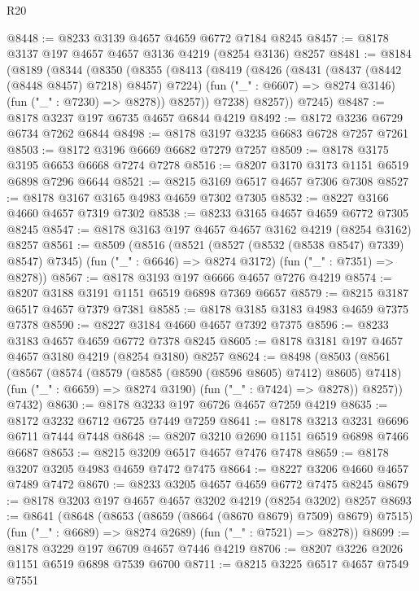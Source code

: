 \begin{lexlean}{R20}
\begin{coremodule}
@8448 := @8233 @3139 @4657 @4659 @6772 @7184 @8245
@8457 := @8178 @3137 @197 @4657 @4657 @3136 @4219 (@8254 @3136) @8257
@8481 := @8184
    (@8189
      (@8344
        (@8350
          (@8355
            (@8413
              (@8419
                (@8426
                  (@8431 (@8437 (@8442 (@8448 @8457) @7218) @8457) @7224)
                  (fun ("_" : @6607) => @8274 @3146)
                  (fun ("_" : @7230) => @8278))
                @8257))
            @7238)
          @8257))
      @7245)
@8487 := @8178 @3237 @197 @6735 @4657 @6844 @4219
@8492 := @8172 @3236 @6729 @6734 @7262 @6844
@8498 := @8178 @3197 @3235 @6683 @6728 @7257 @7261
@8503 := @8172 @3196 @6669 @6682 @7279 @7257
@8509 := @8178 @3175 @3195 @6653 @6668 @7274 @7278
@8516 := @8207 @3170 @3173 @1151 @6519 @6898 @7296 @6644
@8521 := @8215 @3169 @6517 @4657 @7306 @7308
@8527 := @8178 @3167 @3165 @4983 @4659 @7302 @7305
@8532 := @8227 @3166 @4660 @4657 @7319 @7302
@8538 := @8233 @3165 @4657 @4659 @6772 @7305 @8245
@8547 := @8178 @3163 @197 @4657 @4657 @3162 @4219 (@8254 @3162) @8257
@8561 := @8509
    (@8516
      (@8521 (@8527 (@8532 (@8538 @8547) @7339) @8547) @7345)
      (fun ("_" : @6646) => @8274 @3172)
      (fun ("_" : @7351) => @8278))
@8567 := @8178 @3193 @197 @6666 @4657 @7276 @4219
@8574 := @8207 @3188 @3191 @1151 @6519 @6898 @7369 @6657
@8579 := @8215 @3187 @6517 @4657 @7379 @7381
@8585 := @8178 @3185 @3183 @4983 @4659 @7375 @7378
@8590 := @8227 @3184 @4660 @4657 @7392 @7375
@8596 := @8233 @3183 @4657 @4659 @6772 @7378 @8245
@8605 := @8178 @3181 @197 @4657 @4657 @3180 @4219 (@8254 @3180) @8257
@8624 := @8498
    (@8503
      (@8561
        (@8567
          (@8574
            (@8579 (@8585 (@8590 (@8596 @8605) @7412) @8605) @7418)
            (fun ("_" : @6659) => @8274 @3190)
            (fun ("_" : @7424) => @8278))
          @8257))
      @7432)
@8630 := @8178 @3233 @197 @6726 @4657 @7259 @4219
@8635 := @8172 @3232 @6712 @6725 @7449 @7259
@8641 := @8178 @3213 @3231 @6696 @6711 @7444 @7448
@8648 := @8207 @3210 @2690 @1151 @6519 @6898 @7466 @6687
@8653 := @8215 @3209 @6517 @4657 @7476 @7478
@8659 := @8178 @3207 @3205 @4983 @4659 @7472 @7475
@8664 := @8227 @3206 @4660 @4657 @7489 @7472
@8670 := @8233 @3205 @4657 @4659 @6772 @7475 @8245
@8679 := @8178 @3203 @197 @4657 @4657 @3202 @4219 (@8254 @3202) @8257
@8693 := @8641
    (@8648
      (@8653 (@8659 (@8664 (@8670 @8679) @7509) @8679) @7515)
      (fun ("_" : @6689) => @8274 @2689)
      (fun ("_" : @7521) => @8278))
@8699 := @8178 @3229 @197 @6709 @4657 @7446 @4219
@8706 := @8207 @3226 @2026 @1151 @6519 @6898 @7539 @6700
@8711 := @8215 @3225 @6517 @4657 @7549 @7551

\end{coremodule}
\end{lexlean}
